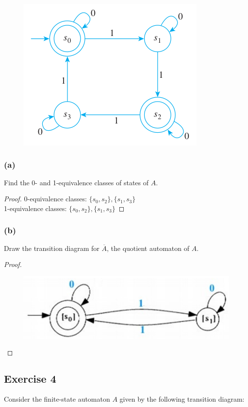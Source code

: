 \documentclass[14pt]{extarticle}
\begin{document}
\begin{figure}[ht!]
    \centering
    \includegraphics[scale=0.5]{../images/12.3.3.png}
\end{figure}

\subsubsection{(a)}
Find the 0- and 1-equivalence classes of states of \(A\).
\begin{proof}
    0-equivalence classes: \(\{s_0, s_2\}, \{s_1, s_3\}\) \\
    1-equivalence classes: \(\{s_0, s_2\}, \{s_1, s_3\}\)
\end{proof}

\subsubsection{(b)}
Draw the transition diagram for \(\overline{A}\), the quotient automaton of \(A\).

\begin{proof}
    \begin{figure}[ht!]
        \centering
        \includegraphics[scale=0.4]{../images/12.3.3.b.png}
    \end{figure}
\end{proof}

\subsection{Exercise 4}
Consider the finite-state automaton \(A\) given by the following transition diagram:
\end{document}
